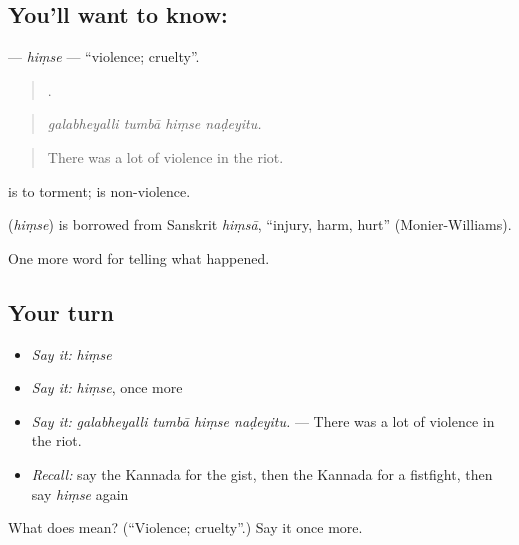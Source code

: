 \subsection*{You'll want to know: }
\textbf{} — \emph{hiṃse} — \textquotedblleft{}violence; cruelty\textquotedblright{}.

\begin{quote}
   .
\end{quote}

\begin{quote}
\emph{galabheyalli tumbā hiṃse naḍeyitu.}
\end{quote}

\begin{quote}
There was a lot of violence in the riot.
\end{quote}

  is to torment;  is non-violence.

\begin{cousinweb}
\textbf{} (\emph{hiṃse}) is borrowed from Sanskrit \emph{hiṃsā}, \textquotedblleft{}injury, harm, hurt\textquotedblright{} (Monier-Williams).
\end{cousinweb}

\begin{grammarlens}[title={What you've built}]
One more word for telling what happened.
\end{grammarlens}

\subsection*{Your turn}
\begin{itemize}
\raggedright
  \item \emph{Say it:} \emph{hiṃse}
  \item \emph{Say it:} \emph{hiṃse}, once more
  \item \emph{Say it:} \emph{galabheyalli tumbā hiṃse naḍeyitu.} — There was a lot of violence in the riot.
  \item \emph{Recall:} say the Kannada for the gist, then the Kannada for a fistfight, then say \emph{hiṃse} again
\end{itemize}

\begin{tcolorbox}[breakable,colback=teal!4,colframe=teal!35!black,title={Before you move on}]
What does  mean? (\textquotedblleft{}Violence; cruelty\textquotedblright{}.) Say it once more.
\end{tcolorbox}
